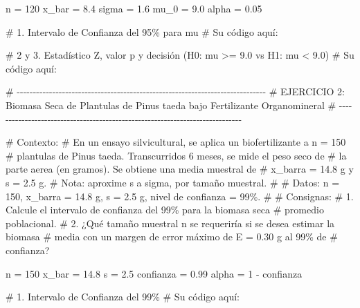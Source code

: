 \documentclass[
  spanish,
  letterpaper,
  DIV=11,
  numbers=noendperiod]{scrreprt}
\newenvironment{Shaded}{\begin{snugshade}}{\end{snugshade}}
\newcommand{\CommentTok}[1]{\textcolor[rgb]{0.37,0.37,0.37}{#1}}
\newcommand{\DecValTok}[1]{\textcolor[rgb]{0.68,0.00,0.00}{#1}}
\newcommand{\FloatTok}[1]{\textcolor[rgb]{0.68,0.00,0.00}{#1}}
\newcommand{\NormalTok}[1]{\textcolor[rgb]{0.00,0.23,0.31}{#1}}
\newcommand{\OtherTok}[1]{\textcolor[rgb]{0.00,0.23,0.31}{#1}}
\newcommand{\SpecialCharTok}[1]{\textcolor[rgb]{0.37,0.37,0.37}{#1}}
\begin{document}
\begin{Shaded}
\begin{Highlighting}[]
\NormalTok{n }\OtherTok{=} \DecValTok{120}
\NormalTok{x\_bar }\OtherTok{=} \FloatTok{8.4}
\NormalTok{sigma }\OtherTok{=} \FloatTok{1.6}
\NormalTok{mu\_0 }\OtherTok{=} \FloatTok{9.0}
\NormalTok{alpha }\OtherTok{=} \FloatTok{0.05}

\CommentTok{\# 1. Intervalo de Confianza del 95\% para mu}
\CommentTok{\# Su código aquí:}



\CommentTok{\# 2 y 3. Estadístico Z, valor p y decisión (H0: mu \textgreater{}= 9.0 vs H1: mu \textless{} 9.0)}
\CommentTok{\# Su código aquí:}



\CommentTok{\# {-}{-}{-}{-}{-}{-}{-}{-}{-}{-}{-}{-}{-}{-}{-}{-}{-}{-}{-}{-}{-}{-}{-}{-}{-}{-}{-}{-}{-}{-}{-}{-}{-}{-}{-}{-}{-}{-}{-}{-}{-}{-}{-}{-}{-}{-}{-}{-}{-}{-}{-}{-}{-}{-}{-}{-}{-}{-}{-}{-}{-}{-}{-}{-}{-}{-}{-}{-}{-}{-}{-}{-}{-}{-}{-}{-}{-}}
\CommentTok{\# EJERCICIO 2: Biomasa Seca de Plantulas de Pinus taeda bajo Fertilizante Organomineral}
\CommentTok{\# {-}{-}{-}{-}{-}{-}{-}{-}{-}{-}{-}{-}{-}{-}{-}{-}{-}{-}{-}{-}{-}{-}{-}{-}{-}{-}{-}{-}{-}{-}{-}{-}{-}{-}{-}{-}{-}{-}{-}{-}{-}{-}{-}{-}{-}{-}{-}{-}{-}{-}{-}{-}{-}{-}{-}{-}{-}{-}{-}{-}{-}{-}{-}{-}{-}{-}{-}{-}{-}{-}{-}{-}{-}{-}{-}{-}{-}}

\CommentTok{\# Contexto:}
\CommentTok{\# En un ensayo silvicultural, se aplica un biofertilizante a n = 150}
\CommentTok{\# plantulas de Pinus taeda. Transcurridos 6 meses, se mide el peso seco de}
\CommentTok{\# la parte aerea (en gramos). Se obtiene una media muestral de}
\CommentTok{\# x\_barra = 14.8 g y s = 2.5 g.}
\CommentTok{\# Nota: aproxime s a sigma, por tamaño muestral.}
\CommentTok{\#}
\CommentTok{\# Datos: n = 150, x\_barra = 14.8 g, s = 2.5 g, nivel de confianza = 99\%.}
\CommentTok{\#}
\CommentTok{\# Consignas:}
\CommentTok{\# 1. Calcule el intervalo de confianza del 99\% para la biomasa seca}
\CommentTok{\#    promedio poblacional.}
\CommentTok{\# 2. ¿Qué tamaño muestral n se requeriría si se desea estimar la biomasa}
\CommentTok{\#    media con un margen de error máximo de E = 0.30 g al 99\% de}
\CommentTok{\#    confianza?}

\NormalTok{n }\OtherTok{=} \DecValTok{150}
\NormalTok{x\_bar }\OtherTok{=} \FloatTok{14.8}
\NormalTok{s }\OtherTok{=} \FloatTok{2.5}
\NormalTok{confianza }\OtherTok{=} \FloatTok{0.99}
\NormalTok{alpha }\OtherTok{=} \DecValTok{1} \SpecialCharTok{{-}}\NormalTok{ confianza}

\CommentTok{\# 1. Intervalo de Confianza del 99\%}
\CommentTok{\# Su código aquí:}




\end{Highlighting}
\end{Shaded}
\end{document}
